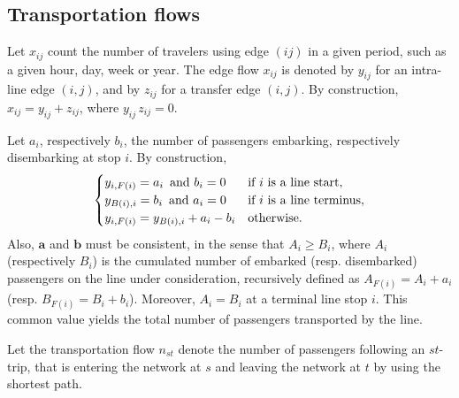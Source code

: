 \documentclass{bmcart}
\begin{document}
\vspace*{0.1cm}

\subsection{Transportation flows}
\label{Transportation flows}
Let  $x_{ij}$ count the number of travelers using edge $(ij)$ in a given period, such as a given hour, day, week or  year.  The edge flow $x_{ij}$ is denoted by $y_{ij}$ for an intra-line edge $(i,j)$, and 
by $z_{ij}$ for a transfer edge $(i,j)$. By construction, $x_{ij}=y_{ij}+z_{ij}$, where $y_{ij}\,  z_{ij}=0$. 

\vspace*{0.1cm}


Let $a_i$, respectively $b_i$, the number of passengers embarking, respectively disembarking at stop $i$. By construction, 
\begin{equation}
\label{bilan1ligne}
\begin{cases}
 y_{i,F(i)}=a_i \text{\,  and } b_i=0   & \text{if $i$ is a line start}, \\
y_{B(i),i}=b_i \text{\,  and } a_i=0   & \text{if $i$ is a line terminus}, \\
 y_{i,F(i)}=y_{B(i),i}+a_i-b_i     & \text{otherwise}.
\end{cases}
\end{equation}
Also, $\mathbf{a}$ and $\mathbf{b}$ must be consistent, in the sense that $A_i\ge B_i$, where $A_i$ (respectively $B_i$) is the cumulated number of embarked 
(resp. disembarked) passengers on the line under consideration, recursively defined as $A_{F(i)}=A_i+a_i$ (resp. $B_{F(i)}=B_i+b_i$). Moreover,  $A_i=B_i$ at a terminal line stop $i$. This common value yields  the total number of passengers transported by the line. 



\vspace*{0.1cm}

Let the transportation flow $n_{st}$ denote the number of passengers following an $st$-trip, that is entering the network at $s$ and leaving the network at $t$ by using the shortest path. 
\end{document}
